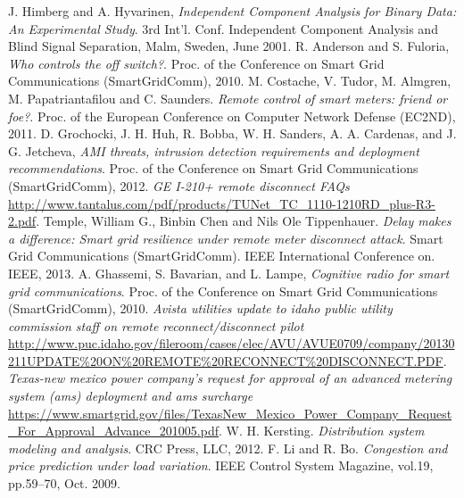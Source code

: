\documentclass[11pt,oneside]{book}
\begin{document}
\begin{thebibliography}{99}
 J. Himberg and A. Hyvarinen, \emph{Independent Component Analysis for Binary Data: An Experimental Study}. 3rd Int’l. Conf. Independent Component Analysis and Blind Signal Separation, Malm, Sweden, June 2001.
 R. Anderson and S. Fuloria, \emph{Who controls the off switch?}. Proc. of the Conference on Smart Grid Communications (SmartGridComm), 2010.
 M. Costache, V. Tudor, M. Almgren, M. Papatriantafilou and C. Saunders. \emph{Remote control of smart meters: friend or foe?}. Proc. of the European Conference on Computer Network Defense (EC2ND), 2011.
 D. Grochocki, J. H. Huh, R. Bobba, W. H. Sanders, A. A. Cardenas, and J. G. Jetcheva, \emph{AMI threats, intrusion detection requirements and deployment recommendations}. Proc. of the Conference on Smart Grid Communications (SmartGridComm), 2012.
 \emph{GE I-210+ remote disconnect FAQs} \url{http://www.tantalus.com/pdf/products/TUNet_TC_1110-1210RD_plus-R3-2.pdf}.
 Temple, William G., Binbin Chen and Nils Ole Tippenhauer. \emph{Delay makes a difference: Smart grid resilience under remote meter disconnect attack}. Smart Grid Communications (SmartGridComm). IEEE International Conference on. IEEE, 2013.
 A. Ghassemi, S. Bavarian, and L. Lampe, \emph{Cognitive radio for smart grid communications}. Proc. of the Conference on Smart Grid Communications (SmartGridComm), 2010.
 \emph{Avista utilities update to idaho public utility commission staff on remote reconnect/disconnect pilot} \url{http://www.puc.idaho.gov/fileroom/cases/elec/AVU/AVUE0709/company/20130211UPDATE\%20ON\%20REMOTE\%20RECONNECT\%20DISCONNECT.PDF}.
 \emph{Texas-new mexico power company’s request for approval of an advanced metering system (ams) deployment and ams surcharge} \url{https://www.smartgrid.gov/files/TexasNew_Mexico_Power_Company_Request_For_Approval_Advance_201005.pdf}.
 W. H. Kersting. \emph{Distribution system modeling and analysis}. CRC Press, LLC, 2012.
 F. Li and R. Bo. \emph{Congestion and price prediction under load variation}. IEEE Control System Magazine, vol.19, pp.59–70, Oct. 2009.
\end{thebibliography}
\end{document}
